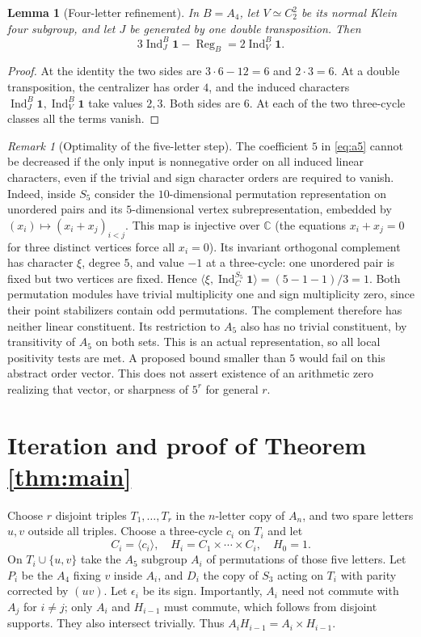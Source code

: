 \documentclass[11pt]{article}
\newtheorem{lemma}[theorem]{Lemma}
\theoremstyle{remark}\newtheorem{remark}[theorem]{Remark}
\newcommand{\Ind}{\operatorname{Ind}}
\newcommand{\Reg}{\operatorname{Reg}}
\newcommand{\one}{\mathbf{1}}
\newcommand{\C}{\mathbb C}
\begin{document}
\begin{lemma}[Four-letter refinement]\label{lem:a4}
In $B=A_4$, let $V\simeq C_2^2$ be its normal Klein four subgroup, and let
$J$ be generated by one double transposition. Then
\begin{equation}\label{eq:a4}
 3\Ind_J^B\one-\Reg_B=2\Ind_V^B\one.
\end{equation}
\end{lemma}
\begin{proof}
At the identity the two sides are $3\cdot6-12=6$ and $2\cdot3=6$.
At a double transposition, the centralizer has order $4$, and the induced
characters $\Ind_J^B\one,\Ind_V^B\one$ take values $2,3$. Both sides are $6$.
At each of the two three-cycle classes all the terms vanish.
\end{proof}

\begin{remark}[Optimality of the five-letter step]\label{rem:sharp}
The coefficient $5$ in \eqref{eq:a5} cannot be decreased if the only input is
nonnegative order on all induced linear characters, even if the trivial and
sign character orders are required to vanish. Indeed, inside $S_5$ consider
the $10$-dimensional permutation representation on unordered pairs and its
$5$-dimensional vertex subrepresentation, embedded by
$(x_i)\mapsto(x_i+x_j)_{i<j}$. This map is injective over $\C$ (the equations
$x_i+x_j=0$ for three distinct vertices force all $x_i=0$). Its invariant
orthogonal complement has character $\xi$, degree $5$, and value $-1$ at a
three-cycle: one unordered pair is fixed but two vertices are fixed. Hence
$\langle\xi,\Ind_C^{S_5}\one\rangle=(5-1-1)/3=1$. Both permutation modules
have trivial multiplicity one and sign multiplicity zero, since their point
stabilizers contain odd permutations. The complement therefore has neither
linear constituent. Its restriction to $A_5$ also has no trivial constituent,
by transitivity of $A_5$ on both sets. This is an actual representation, so all
local positivity tests are met. A proposed bound smaller than $5$ would fail
on this abstract order vector. This does not assert existence of an arithmetic
zero realizing that vector, or sharpness of $5^r$ for general $r$.
\end{remark}

\section{Iteration and proof of Theorem \ref{thm:main}}
Choose $r$ disjoint triples $T_1,\ldots,T_r$ in the $n$-letter copy of $A_n$,
and two spare letters $u,v$ outside all triples. Choose a three-cycle $c_i$ on
$T_i$ and let
\[
 C_i=\langle c_i\rangle,\quad H_i=C_1\times\cdots\times C_i,\quad H_0=1.
\]
On $T_i\cup\{u,v\}$ take the $A_5$ subgroup $A_i$ of permutations of those five
letters. Let $P_i$ be the $A_4$ fixing $v$ inside $A_i$, and $D_i$ the copy of
$S_3$ acting on $T_i$ with parity corrected by $(uv)$. Let $\epsilon_i$ be its
sign. Importantly, $A_i$ need not commute with $A_j$ for $i\ne j$; only
$A_i$ and $H_{i-1}$ must commute, which follows from disjoint supports. They
also intersect trivially. Thus $A_iH_{i-1}=A_i\times H_{i-1}$.
\end{document}

